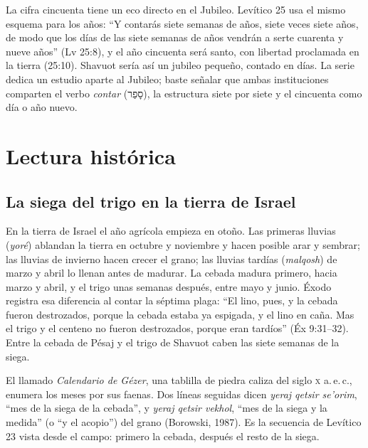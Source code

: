 \documentclass[11pt,letterpaper]{article}
\newcommand{\heb}[1]{\mbox{\foreignlanguage{hebrew}{#1}}}
\begin{document}
La cifra cincuenta tiene un eco directo en el Jubileo. Levítico 25 usa el mismo esquema para los años: ``Y contarás siete semanas de años, siete veces siete años, de modo que los días de las siete semanas de años vendrán a serte cuarenta y nueve años'' (Lv 25:8), y el año cincuenta será santo, con libertad proclamada en la tierra (25:10). Shavuot sería así un jubileo pequeño, contado en días. La serie dedica un estudio aparte al Jubileo; baste señalar que ambas instituciones comparten el verbo \emph{contar} (\heb{סָפַר}), la estructura siete por siete y el cincuenta como día o año nuevo.

\section{Lectura histórica}

\subsection{La siega del trigo en la tierra de Israel}

En la tierra de Israel el año agrícola empieza en otoño. Las primeras lluvias (\emph{yoré}) ablandan la tierra en octubre y noviembre y hacen posible arar y sembrar; las lluvias de invierno hacen crecer el grano; las lluvias tardías (\emph{malqosh}) de marzo y abril lo llenan antes de madurar. La cebada madura primero, hacia marzo y abril, y el trigo unas semanas después, entre mayo y junio. Éxodo registra esa diferencia al contar la séptima plaga: ``El lino, pues, y la cebada fueron destrozados, porque la cebada estaba ya espigada, y el lino en caña. Mas el trigo y el centeno no fueron destrozados, porque eran tardíos'' (Éx 9:31--32). Entre la cebada de Pésaj y el trigo de Shavuot caben las siete semanas de la siega.

El llamado \emph{Calendario de Gézer}, una tablilla de piedra caliza del siglo \textsc{x} a.\,e.\,c., enumera los meses por sus faenas. Dos líneas seguidas dicen \emph{yeraj qetsir se'orim}, ``mes de la siega de la cebada'', y \emph{yeraj qetsir vekhol}, ``mes de la siega y la medida'' (o ``y el acopio'') del grano (Borowski, 1987). Es la secuencia de Levítico 23 vista desde el campo: primero la cebada, después el resto de la siega.
\end{document}

